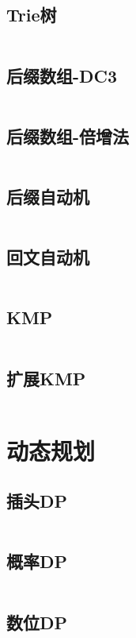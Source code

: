 \documentclass[UTF8]{ctexart}
\begin{document}
\subsection{Trie树}
\inputminted{cpp}{string/Trie树.cpp}

\subsection{后缀数组-DC3}
\inputminted{cpp}{string/后缀数组-DC3.cpp}

\subsection{后缀数组-倍增法}
\inputminted{cpp}{string/后缀数组-倍增法.cpp}

\subsection{后缀自动机}
\inputminted{cpp}{string/后缀自动机.cpp}

\subsection{回文自动机}
\inputminted{cpp}{string/回文自动机.cpp}

\subsection{KMP}
\inputminted{cpp}{string/KMP.cpp}

\subsection{扩展KMP}
\inputminted{cpp}{string/扩展KMP.cpp}

\section{动态规划}

\subsection{插头DP}
\inputminted{cpp}{dp/插头dp.cpp}

\subsection{概率DP}
\inputminted{cpp}{dp/概率dp.cpp}

\subsection{数位DP}
\inputminted{cpp}{dp/数位dp.cpp}
\end{document}
